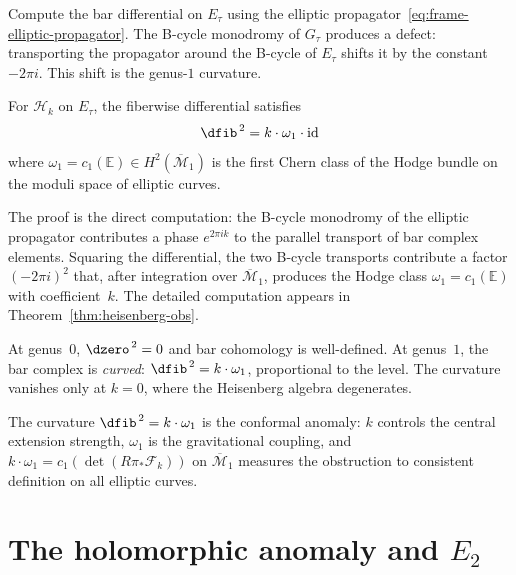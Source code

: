 Compute the bar differential on $E_\tau$ using the elliptic
propagator~\eqref{eq:frame-elliptic-propagator}. The B-cycle
monodromy of $G_\tau$ produces a defect: transporting the
propagator around the B-cycle of $E_\tau$ shifts it by the
constant $-2\pi i$. This shift is the genus-$1$ curvature.

\begin{theorem}\label{thm:frame-genus1-curvature}
For $\mathcal{H}_k$ on $E_\tau$, the fiberwise differential satisfies
\begin{equation}\label{eq:frame-dsquared-genus1}
\dfib^{\,2} = k \cdot \omega_1 \cdot \mathrm{id}
\end{equation}
where $\omega_1 = c_1(\mathbb{E}) \in H^2(\overline{\mathcal{M}}_1)$
is the first Chern class of the Hodge bundle on the moduli space
of elliptic curves.
\end{theorem}

The proof is the direct computation: the B-cycle monodromy of the
elliptic propagator contributes a phase $e^{2\pi i k}$ to the
parallel transport of bar complex elements. Squaring the
differential, the two B-cycle transports contribute a factor
$(-2\pi i)^2$ that, after integration over $\overline{\mathcal{M}}_1$,
produces the Hodge class $\omega_1 = c_1(\mathbb{E})$ with
coefficient~$k$. The detailed computation appears in
Theorem~\ref{thm:heisenberg-obs}.

At genus~$0$, $\dzero^{\,2} = 0$ and bar cohomology is well-defined.
At genus~$1$, the bar complex is \emph{curved}:
$\dfib^{\,2} = k \cdot \omega_1$, proportional to the level. The
curvature vanishes only at $k = 0$, where the Heisenberg algebra
degenerates.

\begin{remark}
\label{rem:frame-curvature-physics}
The curvature $\dfib^{\,2} = k \cdot \omega_1$ is the conformal anomaly: $k$ controls the central extension strength, $\omega_1$ is the gravitational coupling, and $k \cdot \omega_1 = c_1(\det(R\pi_*\mathcal{F}_k))$ on $\overline{\mathcal{M}}_1$ measures the obstruction to consistent definition on all elliptic curves.
\end{remark}

\section{\texorpdfstring{The holomorphic anomaly and $E_2$}{The holomorphic anomaly and E2}}
\label{sec:frame-holomorphic-anomaly}

